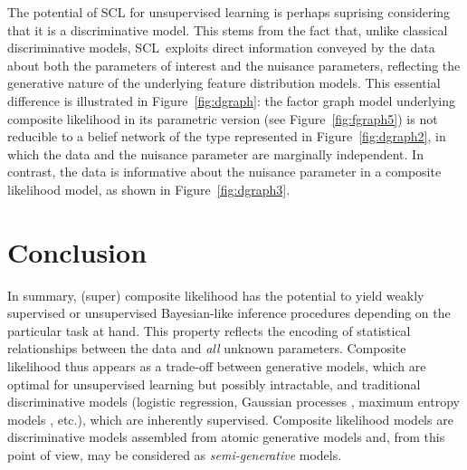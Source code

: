 \documentclass[english]{scrartcl}
\begin{document}
The potential of SCL for unsupervised learning is perhaps suprising considering that it is a discriminative model. This stems from the fact that, unlike classical discriminative models, SCL~exploits direct information conveyed by the data about both the parameters of interest and the nuisance parameters, reflecting the generative nature of the underlying feature distribution models. This essential difference is illustrated in Figure~\ref{fig:dgraph}: the factor graph model underlying composite likelihood in its parametric version (see Figure~\ref{fig:fgraph5}) is not reducible to a belief network of the type represented in Figure~\ref{fig:dgraph2}, in which the data and the nuisance parameter are marginally independent. In contrast, the data is informative about the nuisance parameter in a composite likelihood model, as shown in Figure~\ref{fig:dgraph3}.


\section{Conclusion}
\label{sec:conclusion}

In summary, (super) composite likelihood has the potential to yield weakly supervised or unsupervised Bayesian-like inference procedures depending on the particular task at hand. This property reflects the encoding of statistical relationships between the data and {\em all} unknown parameters. Composite likelihood thus appears as a trade-off between generative models, which are optimal for unsupervised learning but possibly intractable, and traditional discriminative models (logistic regression, Gaussian processes \cite{Rasmussen-06}, maximum entropy models \cite{BergerA-96}, etc.), which are inherently supervised. Composite likelihood models are discriminative models assembled from atomic generative models and, from this point of view, may be considered as {\em semi-generative} models.




\end{document}

